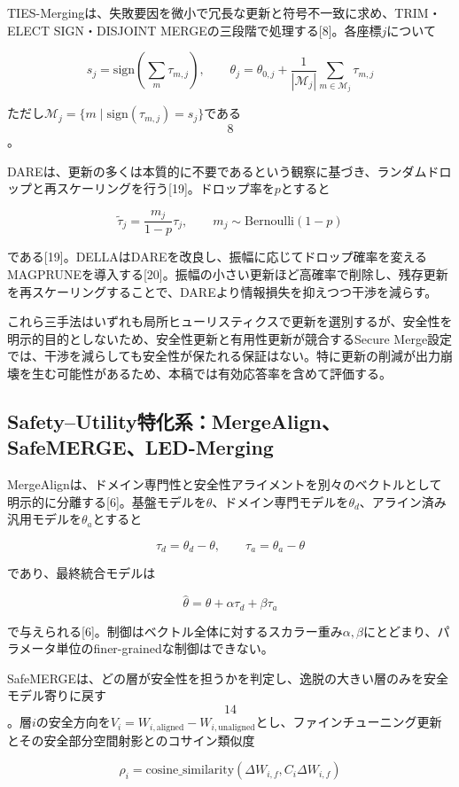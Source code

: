 \documentclass{article}
\begin{document}
TIES-Mergingは、失敗要因を微小で冗長な更新と符号不一致に求め、TRIM・ELECT SIGN・DISJOINT MERGEの三段階で処理する[8]。各座標\(j\)について

\[
s_j=\mathrm{sign}\left(\sum_m \tau_{m,j}\right),\qquad
\theta_j=\theta_{0,j}+\frac{1}{|\mathcal{M}_j|}\sum_{m\in\mathcal{M}_j}\tau_{m,j}
\tag{6}
\]

ただし\(\mathcal{M}_j=\{m\mid \mathrm{sign}(\tau_{m,j})=s_j\}\)である\[8\]。

DAREは、更新の多くは本質的に不要であるという観察に基づき、ランダムドロップと再スケーリングを行う[19]。ドロップ率を\(p\)とすると

\[
\tilde{\tau}_j=\frac{m_j}{1-p}\tau_j,\qquad m_j\sim\mathrm{Bernoulli}(1-p)
\tag{7}
\]

である[19]。DELLAはDAREを改良し、振幅に応じてドロップ確率を変えるMAGPRUNEを導入する[20]。振幅の小さい更新ほど高確率で削除し、残存更新を再スケーリングすることで、DAREより情報損失を抑えつつ干渉を減らす。

これら三手法はいずれも局所ヒューリスティクスで更新を選別するが、安全性を明示的目的としないため、安全性更新と有用性更新が競合するSecure Merge設定では、干渉を減らしても安全性が保たれる保証はない。特に更新の削減が出力崩壊を生む可能性があるため、本稿では有効応答率を含めて評価する。

\subsection{Safety–Utility特化系：MergeAlign、SafeMERGE、LED-Merging}

MergeAlignは、ドメイン専門性と安全性アライメントを別々のベクトルとして明示的に分離する[6]。基盤モデルを\(\theta\)、ドメイン専門モデルを\(\theta_d\)、アライン済み汎用モデルを\(\theta_a\)とすると

\[
\tau_d=\theta_d-\theta,\qquad \tau_a=\theta_a-\theta
\tag{8}
\]

であり、最終統合モデルは

\[
\hat\theta=\theta+\alpha\tau_d+\beta\tau_a
\tag{9}
\]

で与えられる[6]。制御はベクトル全体に対するスカラー重み\(\alpha,\beta\)にとどまり、パラメータ単位のfiner-grainedな制御はできない。

SafeMERGEは、どの層が安全性を担うかを判定し、逸脱の大きい層のみを安全モデル寄りに戻す\[14\]。層\(i\)の安全方向を\(V_i=W_{i,\mathrm{aligned}}-W_{i,\mathrm{unaligned}}\)とし、ファインチューニング更新とその安全部分空間射影とのコサイン類似度

\[
\rho_i=\mathrm{cosine\_similarity}(\Delta W_{i,f},C_i\Delta W_{i,f})
\tag{10}
\]
\end{document}
